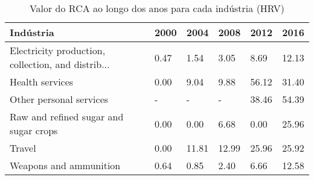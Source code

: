 \begin{table}
\centering
\caption{Valor do RCA ao longo dos anos para cada indústria (HRV)}
\label{tab:ex3-tempo-HRV}
\begin{tabular}{p{6cm}p{1.5cm}p{1.5cm}p{1.5cm}p{1.5cm}p{1.5cm}}
\toprule
                                         Indústria & 2000 &  2004 &  2008 &  2012 &  2016 \\
\midrule
Electricity production, collection, and distrib... & 0.47 &  1.54 &  3.05 &  8.69 & 12.13 \\
                                   Health services & 0.00 &  9.04 &  9.88 & 56.12 & 31.40 \\
                           Other personal services &    - &     - &     - & 38.46 & 54.39 \\
             Raw and refined sugar and sugar crops & 0.00 &  0.00 &  6.68 &  0.00 & 25.96 \\
                                            Travel & 0.00 & 11.81 & 12.99 & 25.96 & 25.92 \\
                            Weapons and ammunition & 0.64 &  0.85 &  2.40 &  6.66 & 12.58 \\
\bottomrule
\end{tabular}
\end{table}
